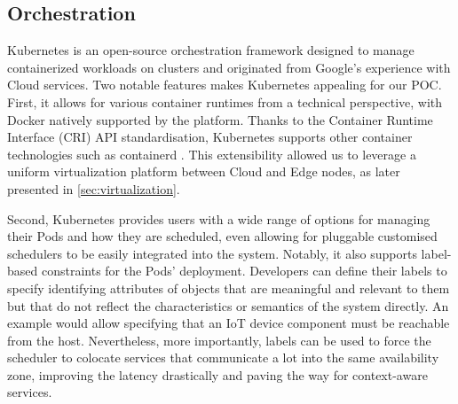 
\subsection{Orchestration}

Kubernetes \cite{kubernetes} is an open-source orchestration framework designed to manage containerized workloads on clusters and originated from Google's experience with Cloud services. Two notable features makes Kubernetes appealing for our POC. First, it allows for various container runtimes from a technical perspective, with Docker natively supported by the platform. Thanks to the Container Runtime Interface (CRI) API standardisation, Kubernetes supports other container technologies such as containerd \cite{containerd}. This extensibility allowed us to leverage a uniform virtualization platform between Cloud and Edge nodes, as later presented in \ref{sec:virtualization}.

Second, Kubernetes provides users with a wide range of options for managing their Pods and how they are scheduled, even allowing for pluggable customised schedulers to be easily integrated into the system. Notably, it also supports label-based constraints for the Pods' deployment. Developers can define their labels to specify identifying attributes of objects that are meaningful and relevant to them but that do not reflect the characteristics or semantics of the system directly. An example would allow specifying that an IoT device component must be reachable from the host. Nevertheless, more importantly, labels can be used to force the scheduler to colocate services that communicate a lot into the same availability zone, improving the latency drastically and paving the way for context-aware services. %

